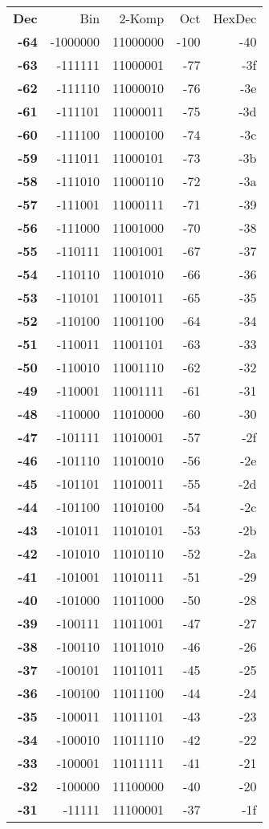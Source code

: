 \documentclass[a4paper]{article}
\begin{document}
\begin{tabular}{|>{\bfseries}r | r | r | r | r |}

Dec & Bin & 2-Komp & Oct & HexDec \\

-64&-1000000&11000000&-100&-40\\
-63&-111111&11000001&-77&-3f\\
-62&-111110&11000010&-76&-3e\\
-61&-111101&11000011&-75&-3d\\
-60&-111100&11000100&-74&-3c\\
-59&-111011&11000101&-73&-3b\\
-58&-111010&11000110&-72&-3a\\
-57&-111001&11000111&-71&-39\\
-56&-111000&11001000&-70&-38\\
-55&-110111&11001001&-67&-37\\
-54&-110110&11001010&-66&-36\\
-53&-110101&11001011&-65&-35\\
-52&-110100&11001100&-64&-34\\
-51&-110011&11001101&-63&-33\\
-50&-110010&11001110&-62&-32\\
-49&-110001&11001111&-61&-31\\
-48&-110000&11010000&-60&-30\\
-47&-101111&11010001&-57&-2f\\
-46&-101110&11010010&-56&-2e\\
-45&-101101&11010011&-55&-2d\\
-44&-101100&11010100&-54&-2c\\
-43&-101011&11010101&-53&-2b\\
-42&-101010&11010110&-52&-2a\\
-41&-101001&11010111&-51&-29\\
-40&-101000&11011000&-50&-28\\
-39&-100111&11011001&-47&-27\\
-38&-100110&11011010&-46&-26\\
-37&-100101&11011011&-45&-25\\
-36&-100100&11011100&-44&-24\\
-35&-100011&11011101&-43&-23\\
-34&-100010&11011110&-42&-22\\
-33&-100001&11011111&-41&-21\\
-32&-100000&11100000&-40&-20\\
-31&-11111&11100001&-37&-1f\\

\end{tabular}
\end{document}
